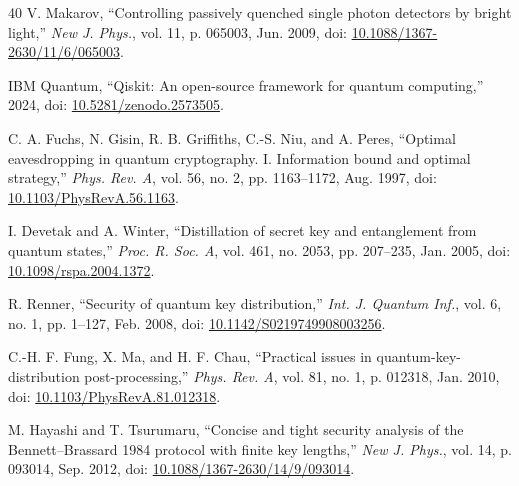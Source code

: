 \documentclass[conference]{IEEEtran}
\begin{document}
\begin{thebibliography}{40}
V. Makarov, ``Controlling passively quenched single photon detectors by bright light,'' \emph{New J. Phys.}, vol. 11, p. 065003, Jun. 2009, doi: \href{https://doi.org/10.1088/1367-2630/11/6/065003}{10.1088/1367-2630/11/6/065003}.

IBM Quantum, ``Qiskit: An open-source framework for quantum computing,'' 2024, doi: \href{https://doi.org/10.5281/zenodo.2573505}{10.5281/zenodo.2573505}.

C. A. Fuchs, N. Gisin, R. B. Griffiths, C.-S. Niu, and A. Peres, ``Optimal eavesdropping in quantum cryptography. I. Information bound and optimal strategy,'' \emph{Phys. Rev. A}, vol. 56, no. 2, pp. 1163--1172, Aug. 1997, doi: \href{https://doi.org/10.1103/PhysRevA.56.1163}{10.1103/PhysRevA.56.1163}.

I. Devetak and A. Winter, ``Distillation of secret key and entanglement from quantum states,'' \emph{Proc. R. Soc. A}, vol. 461, no. 2053, pp. 207--235, Jan. 2005, doi: \href{https://doi.org/10.1098/rspa.2004.1372}{10.1098/rspa.2004.1372}.

R. Renner, ``Security of quantum key distribution,'' \emph{Int. J. Quantum Inf.}, vol. 6, no. 1, pp. 1--127, Feb. 2008, doi: \href{https://doi.org/10.1142/S0219749908003256}{10.1142/S0219749908003256}.

C.-H. F. Fung, X. Ma, and H. F. Chau, ``Practical issues in quantum-key-distribution post-processing,'' \emph{Phys. Rev. A}, vol. 81, no. 1, p. 012318, Jan. 2010, doi: \href{https://doi.org/10.1103/PhysRevA.81.012318}{10.1103/PhysRevA.81.012318}.

M. Hayashi and T. Tsurumaru, ``Concise and tight security analysis of the Bennett--Brassard 1984 protocol with finite key lengths,'' \emph{New J. Phys.}, vol. 14, p. 093014, Sep. 2012, doi: \href{https://doi.org/10.1088/1367-2630/14/9/093014}{10.1088/1367-2630/14/9/093014}.

\end{thebibliography}
\end{document}
